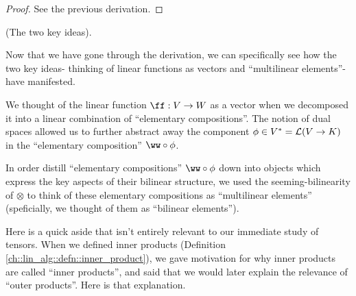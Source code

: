 \begin{proof}
    See the previous derivation.
\end{proof}

\begin{remark}
    (The two key ideas). 
    
    Now that we have gone through the derivation, we can specifically see how the two key ideas- thinking of linear functions as vectors and ``multilinear elements''- have manifested.
    
    We thought of the linear function $\ff:V \rightarrow W$ as a vector when we decomposed it into a linear combination of ``elementary compositions''. The notion of dual spaces allowed us to further abstract away the component $\phi \in V^* = \mathcal{L}(V \rightarrow K)$ in the ``elementary composition'' $\ww \circ \phi$.
    
    In order distill ``elementary compositions'' $\ww \circ \phi$ down into objects which express the key aspects of their bilinear structure, we used the seeming-bilinearity of $\otimes$ to think of these elementary compositions as ``multilinear elements'' (speficially, we thought of them as ``bilinear elements'').
\end{remark}

Here is a quick aside that isn't entirely relevant to our immediate study of tensors. When we defined inner products (Definition \ref{ch::lin_alg::defn::inner_product}), we gave motivation for why inner products are called ``inner products'', and said that we would later explain the relevance of ``outer products''. Here is that explanation. 

